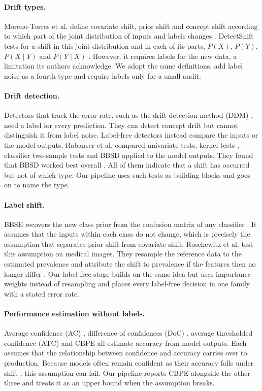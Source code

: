 \documentclass[10pt]{article}
\begin{document}
\paragraph{Drift types.} Moreno-Torres et al. define covariate shift, prior shift and concept shift according to which part of the joint distribution of inputs and labels changes \cite{moreno2012unifying}. DetectShift tests for a shift in this joint distribution and in each of its parts, $P(X)$, $P(Y)$, $P(X\mid Y)$ and $P(Y\mid X)$ \cite{maiapolo2023detectshift}. However, it requires labels for the new data, a limitation its authors acknowledge. We adopt the same definitions, add label noise as a fourth type and require labels only for a small audit.

\paragraph{Drift detection.} Detectors that track the error rate, such as the drift detection method (DDM) \cite{gama2004ddm}, need a label for every prediction. They can detect concept drift but cannot distinguish it from label noise. Label-free detectors instead compare the inputs or the model outputs. Rabanser et al. compared univariate tests, kernel tests \cite{gretton2012kernel}, classifier two-sample tests \cite{lopezpaz2017c2st} and BBSD applied to the model outputs. They found that BBSD worked best overall \cite{rabanser2019failing}. All of them indicate that a shift has occurred but not of which type. Our pipeline uses such tests as building blocks and goes on to name the type.

\paragraph{Label shift.} BBSE recovers the new class prior from the confusion matrix of any classifier \cite{lipton2018bbse}. It assumes that the inputs within each class do not change, which is precisely the assumption that separates prior shift from covariate shift. Roschewitz et al. test this assumption on medical images. They resample the reference data to the estimated prevalence and attribute the shift to prevalence if the features then no longer differ \cite{roschewitz2025shiftid}. Our label-free stage builds on the same idea but uses importance weights instead of resampling and places every label-free decision in one family with a stated error rate.

\paragraph{Performance estimation without labels.} Average confidence (AC) \cite{hendrycks2017baseline}, difference of confidences (DoC) \cite{guillory2021predicting}, average thresholded confidence (ATC) \cite{garg2022atc} and CBPE \cite{kivimaki2025performance} all estimate accuracy from model outputs. Each assumes that the relationship between confidence and accuracy carries over to production. Because models often remain confident as their accuracy falls under shift \cite{ovadia2019trust}, this assumption can fail. Our pipeline reports CBPE alongside the other three and treats it as an upper bound when the assumption breaks.
\end{document}
